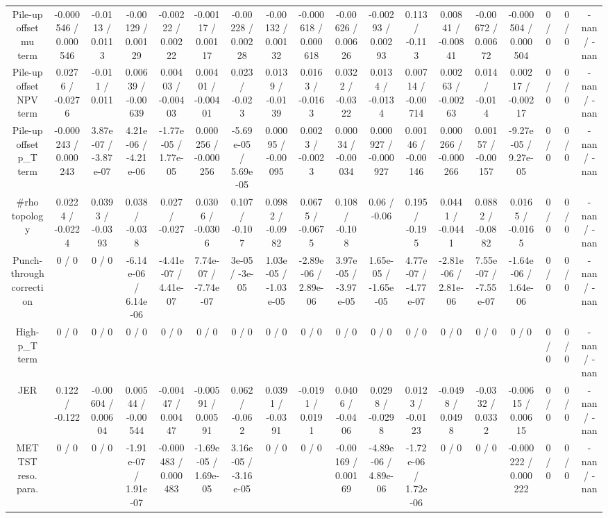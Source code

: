 \documentclass[10pt]{article}
\begin{document}
\begin{table}[htbp]
\begin{center}
\begin{tabular}{|c|c|c|c|c|c|c|c|c|c|c|c|c|c|c|c|c|c|}
  Pile-up offset mu term & -0.000546 / 0.000546 & -0.0113 / 0.0113 & -0.00129 / 0.00129 & -0.00222 / 0.00222 & -0.00117 / 0.00117 & -0.00228 / 0.00228 & -0.00132 / 0.00132 & -0.000618 / 0.000618 & -0.00626 / 0.00626 & -0.00293 / 0.00293 & 0.113 / -0.113 & 0.00841 / -0.00841 & -0.00672 / 0.00672 & -0.000504 / 0.000504 & 0 / 0 & 0 / 0 & -nan / -nan \\ 
  Pile-up offset NPV term & 0.0276 / -0.0276 & -0.011 / 0.011 & 0.00639 / -0.00639 & 0.00403 / -0.00403 & 0.00401 / -0.00401 & 0.023 / -0.023 & 0.0139 / -0.0139 & 0.0163 / -0.0163 & 0.0322 / -0.0322 & 0.0134 / -0.0134 & 0.00714 / -0.00714 & 0.00263 / -0.00263 & 0.014 / -0.014 & 0.00217 / -0.00217 & 0 / 0 & 0 / 0 & -nan / -nan \\ 
  Pile-up offset p_{T} term & -0.000243 / 0.000243 & 3.87e-07 / -3.87e-07 & 4.21e-06 / -4.21e-06 & -1.77e-05 / 1.77e-05 & 0.000256 / -0.000256 & -5.69e-05 / 5.69e-05 & 0.00095 / -0.00095 & 0.0023 / -0.0023 & 0.00034 / -0.00034 & 0.000927 / -0.000927 & 0.00146 / -0.00146 & 0.000266 / -0.000266 & 0.00157 / -0.00157 & -9.27e-05 / 9.27e-05 & 0 / 0 & 0 / 0 & -nan / -nan \\ 
  #rho topology & 0.0224 / -0.0224 & 0.0393 / -0.0393 & 0.038 / -0.038 & 0.027 / -0.027 & 0.0306 / -0.0306 & 0.107 / -0.107 & 0.0982 / -0.0982 & 0.0675 / -0.0675 & 0.108 / -0.108 & 0.06 / -0.06 & 0.195 / -0.195 & 0.0441 / -0.0441 & 0.0882 / -0.0882 & 0.0165 / -0.0165 & 0 / 0 & 0 / 0 & -nan / -nan \\ 
  Punch-through correction & 0 / 0 & 0 / 0 & -6.14e-06 / 6.14e-06 & -4.41e-07 / 4.41e-07 & 7.74e-07 / -7.74e-07 & 3e-05 / -3e-05 & 1.03e-05 / -1.03e-05 & -2.89e-06 / 2.89e-06 & 3.97e-05 / -3.97e-05 & 1.65e-05 / -1.65e-05 & 4.77e-07 / -4.77e-07 & -2.81e-06 / 2.81e-06 & 7.55e-07 / -7.55e-07 & -1.64e-06 / 1.64e-06 & 0 / 0 & 0 / 0 & -nan / -nan \\ 
  High-p_{T} term & 0 / 0 & 0 / 0 & 0 / 0 & 0 / 0 & 0 / 0 & 0 / 0 & 0 / 0 & 0 / 0 & 0 / 0 & 0 / 0 & 0 / 0 & 0 / 0 & 0 / 0 & 0 / 0 & 0 / 0 & 0 / 0 & -nan / -nan \\ 
  JER & 0.122 / -0.122 & -0.00604 / 0.00604 & 0.00544 / -0.00544 & -0.00447 / 0.00447 & -0.00591 / 0.00591 & 0.062 / -0.062 & 0.0391 / -0.0391 & -0.0191 / 0.0191 & 0.0406 / -0.0406 & 0.0298 / -0.0298 & 0.0123 / -0.0123 & -0.0498 / 0.0498 & -0.0332 / 0.0332 & -0.00615 / 0.00615 & 0 / 0 & 0 / 0 & -nan / -nan \\ 
  MET TST reso. para. & 0 / 0 & 0 / 0 & -1.91e-07 / 1.91e-07 & -0.000483 / 0.000483 & -1.69e-05 / 1.69e-05 & 3.16e-05 / -3.16e-05 & 0 / 0 & 0 / 0 & -0.00169 / 0.00169 & -4.89e-06 / 4.89e-06 & -1.72e-06 / 1.72e-06 & 0 / 0 & 0 / 0 & -0.000222 / 0.000222 & 0 / 0 & 0 / 0 & -nan / -nan \\ 

\end{tabular}
\end{center}
\end{table}
\end{document}
